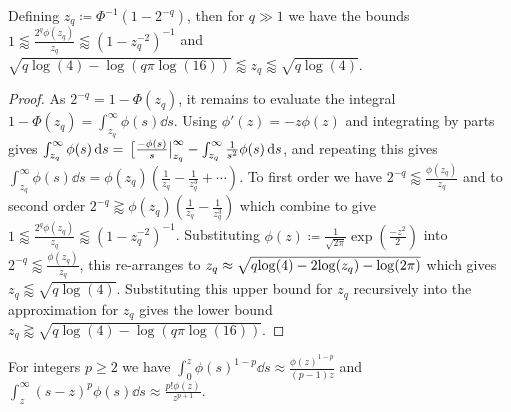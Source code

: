 \documentclass[manuscript,review]{acmart}
\begin{document}
\begin{lemma}
\label{lemma:approximate_tail_values}
Defining $ z_q \coloneqq \Phi^{-1}(1 - 2^{-q})$, then for $ q \gg 1 $ we have the bounds $ 1 \lessapprox \tfrac{2^q\phi(z_q)}{z_q} \lessapprox (1 - z_q^{-2})^{-1}$  and $ \sqrt{q \log(4) - \log(q \pi \log(16))} \lessapprox z_q  \lessapprox \sqrt{q \log(4)}$.
\end{lemma}

\begin{proof}
As $ 2^{-q} = 1 - \Phi(z_q) $, it remains to evaluate the integral $ 1 - \Phi(z_q) = \int_{z_q}^{\infty} \phi(s) \dd{s} $. Using $ \phi'(z) =  -z \phi(z) $ and integrating by parts gives $ \int_{z_q}^{\infty} \phi(s) \dd{s} = \eval*[\tfrac{-\phi(s)}{s}|_{z_q}^{\infty} - \int_{z_q}^{\infty} \tfrac{1}{s^2} \phi(s) \dd{s} $, and repeating this gives $ \int_{z_q}^{\infty} \phi(s) \dd{s}  = \phi(z_q)(\tfrac{1}{z_q} - \tfrac{1}{z_q^3} + \cdots) $. To first order we have $ 2^{-q} \lessapprox \tfrac{\phi(z_q)}{z_q} $ and to second order $ 2^{-q} \gtrapprox \phi(z_q)(\tfrac{1}{z_q} - \tfrac{1}{z_q^3}) $ which combine to give $ 1 \lessapprox \tfrac{2^q\phi(z_q)}{z_q} \lessapprox (1 - z_q^{-2})^{-1}$.  Substituting $ \phi(z) \coloneqq \tfrac{1}{\sqrt{2 \pi}} {\exp}(\tfrac{-z^2}{2}) $ into $ 2^{-q} \lessapprox \tfrac{\phi(z_q)}{z_q} $, this re-arranges to $ z_q \approx \sqrt{q{\log}(4) - 2{\log}(\smash{z_q}) - {\log}(2\pi)} $ which gives $ z_q \lessapprox \sqrt{q \log(4)} $. Substituting this upper bound for $ z_q $ recursively into the approximation  for $ z_q $ gives the lower bound $ z_q \gtrapprox  \sqrt{q \log(4) - \log(q \pi \log(16))}$. \qedhere
\end{proof}

\begin{lemma}
\label{lemma:approximate_moments}
For integers $ p \geq 2 $ we have $ \int_{0}^{z} \phi(s)^{1-p} \dd{s} \approx \tfrac{\phi(z)^{1-p}}{(p-1)z}  $ and $ \int_{z}^{\infty} (s-z)^p\phi(s) \dd{s} \approx \tfrac{p!\phi(z)}{z^{p+1}} $.
\end{lemma}
\end{document}
